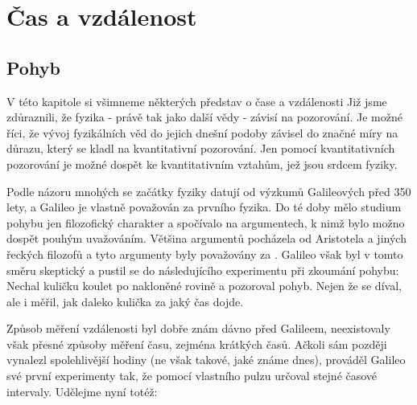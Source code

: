 \setchaptertoc
\chapter{Čas a vzdálenost}\label{chap:fey_cas}

  \section{Pohyb}
    V této kapitole si všimneme některých představ o čase a vzdálenosti Již jsme zdůraznili, že 
    fyzika - právě tak jako další vědy - závisí na pozorování. Je možné říci, že vývoj fyzikálních 
    věd do jejich dnešní podoby závisel do značné míry na důrazu, který se kladl na kvantitativní 
    pozorování. Jen pomocí kvantitativních pozorování je možné dospět ke kvantitativním vztahům, 
    jež jsou srdcem fyziky.
    
    Podle názoru mnohých se začátky fyziky datují od výzkumů Galileových před 350 lety, a Galileo 
    je vlastně považován za prvního fyzika. Do té doby mělo studium pohybu jen filozofický 
    charakter a spočívalo na argumentech, k nimž bylo možno dospět pouhým uvažováním. Většina 
    argumentů pocházela od Aristotela a jiných řeckých filozofů a tyto argumenty byly považovány za 
    . Galileo však byl v tomto směru skeptický a pustil se do následujícího 
    experimentu při zkoumání pohybu: Nechal kuličku koulet po nakloněné rovině a pozoroval pohyb. 
    Nejen že se díval, ale i měřil, jak daleko kulička za jaký čas dojde.
    
    
    Způsob měření vzdálenosti byl dobře znám dávno před Galileem, neexistovaly však přesné způsoby 
    měření času, zejména krátkých časů. Ačkoli sám později vynalezl spolehlivější hodiny (ne však 
    takové, jaké známe dnes), prováděl Galileo své první experimenty tak, že pomocí vlastního 
    pulzu určoval stejné časové intervaly. Udělejme nyní totéž:
    
